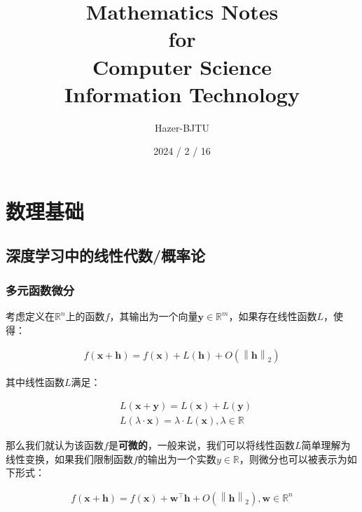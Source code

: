 \documentclass[UTF8]{book}
\title{\Huge{Mathematics Notes} \\ \huge{for} \\ \Huge{Computer Science} \\ \Huge{Information Technology}}
\author{\Large Hazer-BJTU}
\date{\Large 2024 / 2 / 16}
\begin{document}
\maketitle
\tableofcontents %


\chapter{数理基础}

\section{深度学习中的线性代数/概率论}

\subsection{多元函数微分}
考虑定义在$\mathbb{R}^n$上的函数$f$，其输出为一个向量$\mathbf{y}\in \mathbb{R}^m$，如果存在线性函数$L$，使得：
\begin{large}
    \begin{equation}
        \begin{aligned}
            f(\mathbf{x}+\mathbf{h})=f(\mathbf{x})+L(\mathbf{h})+O\left (\left \| \mathbf{h} \right \|_2\right )
            \nonumber
        \end{aligned}
    \end{equation}
\end{large}
其中线性函数$L$满足：
\begin{large}
    \begin{equation}
        \begin{aligned}
            &L(\mathbf{x}+\mathbf{y})=L(\mathbf{x})+L(\mathbf{y}) \\
            &L(\lambda \cdot \mathbf x)=\lambda \cdot L(\mathbf x), \lambda \in \mathbb{R}
            \nonumber 
        \end{aligned}
    \end{equation}
\end{large}
那么我们就认为该函数$f$是\textbf{可微的}，一般来说，我们可以将线性函数$L$简单理解为线性变换，如果我们限制函数$f$的输出为一个实数$y\in\mathbb{R}$，则微分也可以被表示为如下形式：
\begin{large}
    \begin{equation}
        \begin{aligned}
            f(\mathbf{x}+\mathbf{h})=f(\mathbf{x})+\mathbf{w}^\top\mathbf{h}+O\left (\left \| \mathbf{h} \right \|_2\right ), \mathbf{w}\in \mathbb{R}^n
            \nonumber
        \end{aligned}
    \end{equation}
\end{large}
\end{document}
